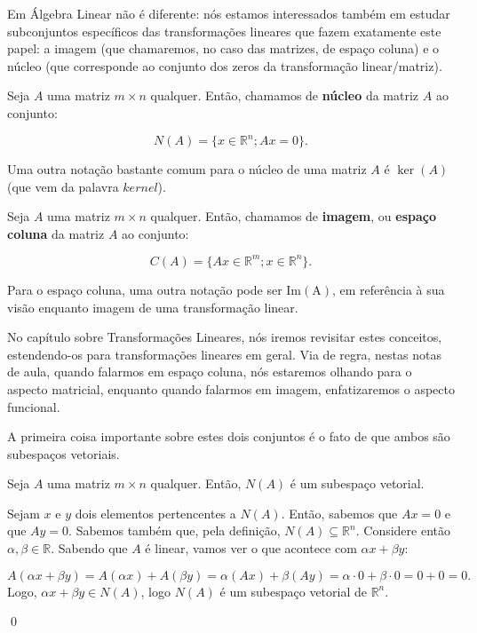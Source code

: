 Em Álgebra Linear não é diferente: nós estamos interessados também em estudar subconjuntos específicos das transformações lineares que fazem exatamente este papel: a imagem (que chamaremos, no caso das matrizes, de espaço coluna) e o núcleo (que corresponde ao conjunto dos zeros da transformação linear/matriz).

\begin{Definition}
	Seja $A$ uma matriz $m\times n$ qualquer. Então, chamamos de \textbf{núcleo} da matriz $A$ ao conjunto:
	
	$$
	N(A) = \{x\in\mathbb{R}^n; Ax = 0\}.
	$$
\end{Definition}

Uma outra notação bastante comum para o núcleo de uma matriz $A$ é $\ker(A)$ (que vem da palavra $\mathit{kernel}$).

\begin{Definition}
	Seja $A$ uma matriz $m\times n$ qualquer. Então, chamamos de \textbf{imagem}, ou \textbf{espaço coluna} da matriz $A$ ao conjunto:
	
	$$
	C(A) = \{Ax\in\mathbb{R}^m; x\in\mathbb{R}^n\}.
	$$
\end{Definition}

Para o espaço coluna, uma outra notação pode ser $\operatorname{Im(A)}$, em referência à sua visão enquanto imagem de uma transformação linear.

No capítulo sobre Transformações Lineares, nós iremos revisitar estes conceitos, estendendo-os para transformações lineares em geral. Via de regra, nestas notas de aula, quando falarmos em espaço coluna, nós estaremos olhando para o aspecto matricial, enquanto quando falarmos em imagem, enfatizaremos o aspecto funcional.

A primeira coisa importante sobre estes dois conjuntos é o fato de que ambos são subespaços vetoriais.

\begin{Proposition}
	Seja $A$ uma matriz $m\times n$ qualquer. Então, $N(A)$ é um subespaço vetorial.
\end{Proposition}

\begin{Proof}
	Sejam $x$ e $y$ dois elementos pertencentes a $N(A)$. Então, sabemos que $Ax = 0$ e que $Ay = 0$. Sabemos também que, pela definição, $N(A)\subseteq\mathbb{R}^n$. Considere então $\alpha, \beta\in\mathbb{R}$. Sabendo que $A$ é linear, vamos ver o que acontece com $\alpha x + \beta y$:
	
	$$
	A(\alpha x + \beta y) = A(\alpha x) + A(\beta y) = \alpha(Ax) + \beta(Ay) = \alpha\cdot 0 + \beta\cdot 0 = 0 + 0 = 0.
	$$
	Logo, $\alpha x + \beta y\in N(A)$, logo $N(A)$ é um subespaço vetorial de $\mathbb{R}^n$.
	
	\qed
\end{Proof}

